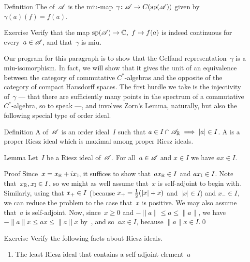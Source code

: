 \documentclass[a]{subfiles}
\begin{document}
\begin{parsec}
\begin{point}{Definition}
The 
of~$\mathscr{A}$
is the miu-map~$\gamma\colon \mathscr{A}\to C(\mathrm{sp}(\mathscr{A}))$
given by $\gamma(a)(f)=f(a)$.
\begin{point}{Exercise}%
Verify that 
 the map $\mathrm{sp}(\mathscr{A})\to \mathbb{C},\ f\mapsto f(a)$ is indeed
continuous for every~$a\in\mathscr{A}$,
and that~$\gamma$ is miu.
\end{point}
\end{point}
\begin{point}%
Our program for this paragraph is to show that
the Gelfand representation~$\gamma$ is 
a miu-isomorphism.
In fact,
we will show that it gives the unit
of an equivalence between the category of commutative $C^*$-algebras
and the opposite of the category of compact Hausdorff spaces.
The first hurdle we take is the injectivity of~$\gamma$
--- that there are sufficiently many
points in the spectrum of a commutative $C^*$-algebra,
so to speak ---,
and involves Zorn's Lemma,
naturally,
but also the following special type of order ideal.
\end{point}
\begin{point}{Definition}%
A  of~$\mathscr{A}$
is an order ideal~$I$
such that $a\in I\cap\mathscr{A}_{\mathbb{R}}\implies \left|a\right|\in I$.
A 
is a proper Riesz ideal which is maximal among
proper Riesz ideals.
\end{point}
\begin{point}{Lemma}%
Let~$I$ be a Riesz ideal of~$\mathscr{A}$.
For all~$a\in \mathscr{A}$ and $x\in I$ we have $ax\in I$.
\begin{point}{Proof}%
Since~$x=x_{\mathbb{R}}+ix_{\mathbb{I}}$,
it suffices to show that~$ax_{\mathbb{R}}\in I$ and $ax_{\mathbb{I}}\in I$.
Note that~$x_{\mathbb{R}},x_{\mathbb{I}}\in I$,
so we might as well assume that~$x$ is self-adjoint to begin with.
Similarly, using that
 $x_{+}\in I$ (because $x_{+}=\frac{1}{2}(\left|x\right|+x)$
and~$\left|x\right|\in I$) and $x_-\in I$,
we can reduce the problem to the case that~$x$ is positive.
We may also assume that~$a$ is self-adjoint.
Now, since~$x\geq 0$ and $-\|a\|\leq a\leq \|a\|$,
we have $-\|a\|x \leq ax\leq \|a\|x$
by~,
and so~$ax\in I$,
because $\|a\|x\in I$.\qed
\end{point}
\end{point}
\begin{point}{Exercise}%
Verify the following facts about Riesz ideals.
\begin{enumerate}
\item
The least Riesz ideal that contains a self-adjoint element~$a$

\end{enumerate}
\end{point}
\end{parsec}
\end{document}
